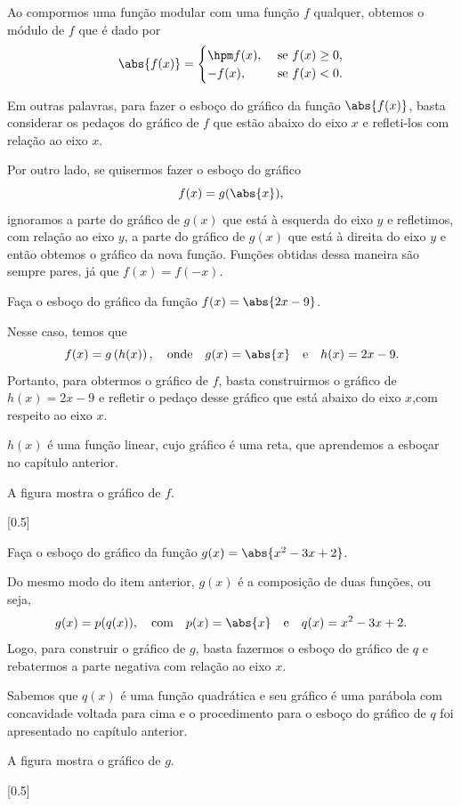 Ao compormos uma função modular com uma função $f$ qualquer,
obtemos o módulo de $f$ que é dado por
\[
  \abs{f(x)} = \begin{cases}
  \hpm f(x), & \text{ se } f(x) \geq 0,\\
  -    f(x), & \text{ se } f(x) <    0.
  \end{cases}
\]

Em outras palavras, para fazer o esboço do gráfico da função
$\abs{f(x)}$, basta considerar os pedaços do gráfico de $f$
que estão abaixo do eixo $x$ e refleti-los com relação ao eixo $x$.

Por outro lado, se quisermos fazer o esboço do gráfico
\[
  f(x)= g(\abs{x}),
\]
ignoramos a parte do gráfico de $g(x)$ que está à esquerda do eixo $y$
e refletimos, com relação ao eixo $y$, a parte do gráfico de $g(x)$
que está à direita do eixo $y$ e então obtemos o gráfico da nova função.
Funções obtidas dessa maneira são sempre pares, já que $f(x) = f(-x)$.

\begin{example}
  Faça o esboço do gráfico da função
  \(
    f(x)= \abs{2x-9}
  \).

  \solution
  Nesse caso, temos que
  \[
    f(x) = g\left(h(x)\right),
    \quad\text{onde}\quad
    g(x) = \abs{x}
    \quad\text{e}\quad
    h(x) = 2x-9.
  \]
  Portanto, para obtermos o gráfico de $f$, basta construirmos o gráfico de
  $h(x)=2x-9$ e refletir o pedaço desse gráfico que está abaixo do eixo
  $x$,com respeito ao eixo $x$.

  $h(x)$ é uma função linear, cujo gráfico é
  uma reta, que aprendemos a esboçar no capítulo anterior.

  A figura mostra o gráfico de $f$.

  [0.5]
\end{example}

\begin{example}
  Faça o esboço do gráfico da função
  \(
    g(x) = \abs{x^2-3x+2}
  \).

  \solution
  Do mesmo modo do item anterior, $g(x)$ é a composição de duas funções, ou
  seja,
  \[
    g(x) = p(q(x)),
    \quad\text{com}\quad
    p(x) = \abs{x}
    \quad\text{e}\quad
    q(x) = x^2 - 3x + 2.
  \]
  Logo, para construir o gráfico de $g$, basta fazermos o esboço
  do gráfico de $q$ e rebatermos a parte negativa com relação ao eixo $x$.

  Sabemos que $q(x)$ é uma função quadrática e seu gráfico é uma
  parábola com concavidade voltada para cima e o procedimento para
  o esboço do gráfico de $q$ foi apresentado no capítulo anterior.

  A figura mostra o gráfico de $g$.

  [0.5]
\end{example}


